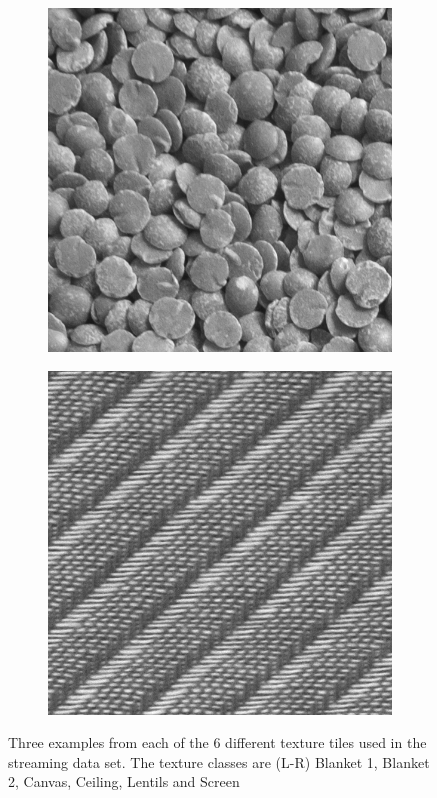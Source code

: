 \begin{figure}[h!]
\begin{subfigure}{.15\textwidth}
  \includegraphics[width=.8\linewidth]{kylberg_examples/lentils1_003.png}
\end{subfigure}
\begin{subfigure}{.15\textwidth}
  \centering
  \includegraphics[width=.8\linewidth]{kylberg_examples/screen1_003.png}
\end{subfigure}
\caption{Three examples from each of the 6 different texture tiles used in the streaming data set. The texture classes are (L-R) Blanket 1, Blanket 2, Canvas, Ceiling, Lentils and Screen}
\label{fig:texture_examples}
\end{figure}

